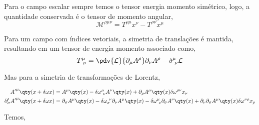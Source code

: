 \documentclass[twoside]{amsart}
\numberwithin{equation}{section}
\begin{document}
\begin{refsection}
Para o campo escalar sempre temos o tensor energia momento simétrico, logo, a quantidade conservada é o tensor de momento angular, $$\mathcal M^{\rho\mu\nu}=T^{\rho\mu}x^\nu-T^{\rho\nu}x^\mu$$

Para um campo com índices vetoriais, a simetria de translações é mantida, resultando em um tensor de energia momento associado como, $$T^{\mu}_{\ \nu}=\pdv{\mathcal L}{\partial_\mu A^\rho}\partial_\nu A^\rho-\delta^{\mu}_{\ \nu}\mathcal L$$

Mas para a simetria de transformações de Lorentz, 

\begin{align}
    {A'}^\mu\qty(x+\delta \omega x)&=A^\mu\qty(x)-\delta\omega^{\mu}_{\ \nu}A^\nu\qty(x)+\partial_\rho A^\mu\qty(x)\delta\omega^{\rho \nu}x_\nu\\
    \partial_\sigma'{A'}^\mu\qty(x+\delta\omega x)&=\partial_\sigma A^\mu\qty(x)-\delta\omega_{\sigma}^{\ \nu}\partial_\nu A^\mu\qty(x)-\delta\omega^{\mu}_{\ \nu}\partial_\sigma A^\nu\qty(x)+\partial_\nu\partial_\sigma A^\mu\qty(x)\delta\omega^{\nu\rho}x_\rho
\end{align}

Temos,


\end{refsection}
\end{document}
